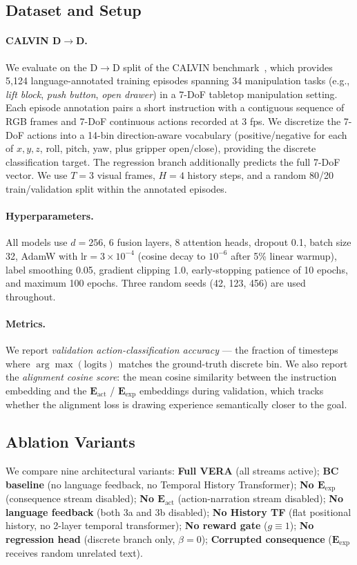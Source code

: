 \documentclass{article}
\newcommand{\vera}{\textsc{VERA}}
\newcommand{\eact}{$\mathbf{E}_\text{act}$}
\newcommand{\eexp}{$\mathbf{E}_\text{exp}$}
\begin{document}
\subsection{Dataset and Setup}
\paragraph{CALVIN D$\rightarrow$D.}
We evaluate on the D$\rightarrow$D split of the CALVIN benchmark~\citep{calvin},
which provides 5,124 language-annotated training episodes spanning 34 manipulation
tasks (e.g., \textit{lift block}, \textit{push button}, \textit{open drawer}) in a
7-DoF tabletop manipulation setting.
Each episode annotation pairs a short instruction with a contiguous sequence of
RGB frames and 7-DoF continuous actions recorded at 3 fps.
We discretize the 7-DoF actions into a 14-bin direction-aware vocabulary
(positive/negative for each of $x, y, z$, roll, pitch, yaw, plus gripper open/close),
providing the discrete classification target.
The regression branch additionally predicts the full 7-DoF vector.
We use $T=3$ visual frames, $H=4$ history steps, and a random 80/20 train/validation
split within the annotated episodes.

\paragraph{Hyperparameters.}
All models use $d=256$, 6 fusion layers, 8 attention heads, dropout 0.1,
batch size 32, AdamW with $\text{lr}=3\times10^{-4}$ (cosine decay to $10^{-6}$
after 5\% linear warmup), label smoothing 0.05, gradient clipping 1.0,
early-stopping patience of 10 epochs, and maximum 100 epochs.
Three random seeds (42, 123, 456) are used throughout.

\paragraph{Metrics.}
We report \emph{validation action-classification accuracy} — the fraction of
timesteps where $\arg\max(\text{logits})$ matches the ground-truth discrete bin.
We also report the \emph{alignment cosine score}: the mean cosine similarity between
the instruction embedding and the \eact{} / \eexp{} embeddings during validation,
which tracks whether the alignment loss is drawing experience semantically closer
to the goal.

\subsection{Ablation Variants}
We compare nine architectural variants:
\textbf{Full \vera{}} (all streams active);
\textbf{BC baseline} (no language feedback, no Temporal History Transformer);
\textbf{No \eexp{}} (consequence stream disabled);
\textbf{No \eact{}} (action-narration stream disabled);
\textbf{No language feedback} (both 3a and 3b disabled);
\textbf{No History TF} (flat positional history, no 2-layer temporal transformer);
\textbf{No reward gate} ($g \equiv 1$);
\textbf{No regression head} (discrete branch only, $\beta=0$);
\textbf{Corrupted consequence} (\eexp{} receives random unrelated text).
\end{document}
